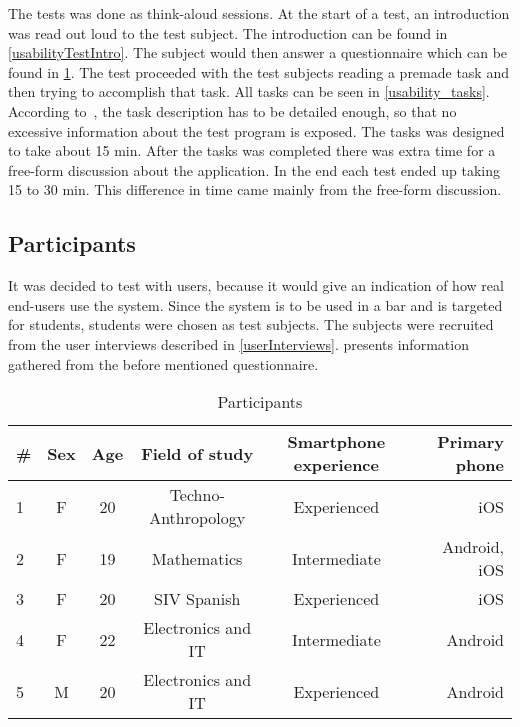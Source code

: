 The tests was done as think-aloud sessions. At the start of a test, an introduction was read out loud to the test
subject. The introduction can be found in
\cref{usabilityTestIntro}. The subject would then answer a
questionnaire which can be found in \cref{tab:participants}. The test
proceeded with the test subjects reading a premade task and then
trying to accomplish that task. All tasks can be seen in \cref{usability_tasks}. According to~\cite{RubinChisnellSpool08}, the task description has to be detailed enough, so that no excessive information about the test program is exposed. The tasks was designed to take about 15 min. After the tasks was completed there was extra time for a free-form discussion about the application. In the end each test ended up taking 15 to 30 min. This difference in time came mainly from the free-form discussion.

\subsection{Participants}
It was decided to test with users, because it would give an indication
of how real end-users use the system. Since the system is to be used
in a bar and is targeted for students, students were chosen as test
subjects. The subjects were recruited from the user interviews
described in \cref{userInterviews}.  presents
information gathered from the before mentioned questionnaire.

\begin{table}[hbtp]
    \centering
    \tabcolsep=0.10cm
    \begin{tabular}{lccccr}
        \toprule
        \textbf{\#} & \textbf{Sex} & \textbf{Age} & \textbf{Field of study} &
        \textbf{Smartphone experience} & \textbf{Primary phone} \\
        \midrule
        1                   & F               & 20           & Techno-Anthropology       & Experienced                    & iOS                    \\
        2                   & F               & 19           & Mathematics             & Intermediate                   & Android, iOS           \\
        3                   & F               & 20           & SIV Spanish             & Experienced                    & iOS                    \\
        4                   & F               & 22           & Electronics and IT      & Intermediate                   & Android                \\
        5                   & M               & 20           & Electronics and
        IT      & Experienced                    & Android                \\
        \bottomrule
    \end{tabular}
    \caption{Participants}\label{tab:participants}
\end{table}

